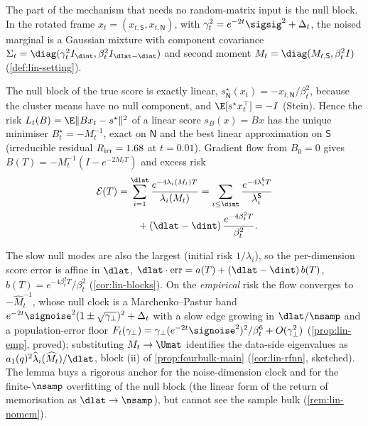 The part of the mechanism that needs no random-matrix input is the null block. In the rotated frame $x_t=(x_{t,\mathsf S},x_{t,\mathsf N})$, with $\gamma_t^2=e^{-2t}\sigsig^2+\Delta_t$, the noised marginal is a Gaussian mixture with component covariance $\Sigma_t=\diag(\gamma_t^2I_{\dint},\beta_t^2I_{\dlat-\dint})$ and second moment $M_t=\diag(M_{t,\mathsf S},\beta_t^2I)$ (\cref{def:lin-setting}).

\begin{lemma}\label{lem:null-exact-lin-main}
The null block of the true score is exactly linear, $s^\star_{\mathsf N}(x_t)=-x_{t,\mathsf N}/\beta_t^2$, because the cluster means have no null component, and $\E[s^\star x_t^{\top}]=-I$ (Stein). Hence the risk $L_t(B)=\E\|Bx_t-s^\star\|^2$ of a linear score $s_B(x)=Bx$ has the unique minimiser $B^\star_t=-M_t^{-1}$, exact on $\mathsf N$ and the best linear approximation on $\mathsf S$ (irreducible residual $R_{\rm irr}=1.68$ at $t=0.01$). Gradient flow from $B_0=0$ gives $B(T)=-M_t^{-1}(I-e^{-2M_tT})$ and excess risk
\begin{align}
\mathcal E(T)&=\sum_{i=1}^{\dlat}\frac{e^{-4\lambda_i(M_t)T}}{\lambda_i(M_t)}
=\sum_{i\le\dint}\frac{e^{-4\lambda^{\mathsf S}_iT}}{\lambda^{\mathsf S}_i}\nonumber\\
&\qquad+(\dlat-\dint)\,\frac{e^{-4\beta_t^2T}}{\beta_t^2}.\label{eq:lin-excess-main}
\end{align}
\end{lemma}
The slow null modes are also the largest (initial risk $1/\lambda_i$), so the per-dimension score error is affine in $\dlat$, $\dlat\cdot\mathrm{err}=a(T)+(\dlat-\dint)\,b(T)$, $b(T)=e^{-4\beta_t^2T}/\beta_t^2$ (\cref{cor:lin-blocks}). On the \emph{empirical} risk the flow converges to $-\widehat M_t^{-1}$, whose null clock is a Marchenko--Pastur band $e^{-2t}\signoise^2(1\pm\sqrt{\gamma_\perp})^2+\Delta_t$ with a slow edge growing in $\dlat/\nsamp$ and a population-error floor $F_t(\gamma_\perp)=\gamma_\perp(e^{-2t}\signoise^2)^2/\beta_t^6+O(\gamma_\perp^2)$ (\cref{prop:lin-emp}, proved); substituting $M_t\to\Umat$ identifies the data-side eigenvalues as $a_1(q)^2\widehat\lambda_i(\widehat M_t)/\dlat$, block (ii) of \cref{prop:fourbulk-main} (\cref{cor:lin-rfnn}, sketched). The lemma buys a rigorous anchor for the noise-dimension clock and for the finite-$\nsamp$ overfitting of the null block (the linear form of the return of memorisation as $\dlat\to\nsamp$), but cannot see the sample bulk (\cref{rem:lin-nomem}).

